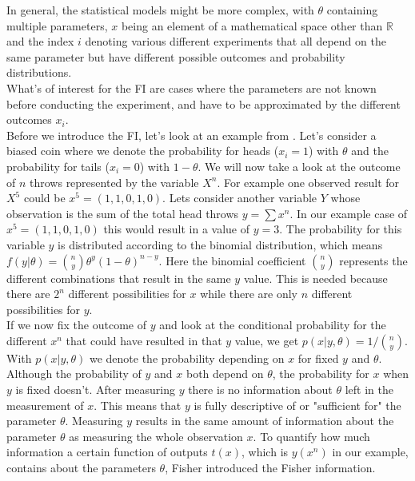 In general, the statistical models might be more complex, with $\theta$ containing multiple parameters, $x$ being an element of a mathematical space other than $\mathbb{R}$ and the index $i$ denoting various different experiments that all depend on the same parameter but have different possible outcomes and probability distributions.\\

What's of interest for the FI are cases where the parameters are not known before conducting the experiment, and have to be approximated by the different outcomes $x_i$.\\
Before we introduce the FI, let's look at an example from \cite{StatisticFisherInfoTutorial}. Let's consider a biased coin where we denote the probability for heads ($x_i = 1$) with $\theta$ and the probability for tails ($x_i = 0$) with $1-\theta$. We will now take a look at the outcome of $n$ throws represented by the variable $X^n$. For example one observed result for $X^5$ could be $x^5 = (1,1,0,1,0)$. Lets consider another variable $Y$ whose observation is the sum of the total head throws $y = \sum x^n$. In our example case of $x^5 = (1,1,0,1,0)$ this would result in a value of $y = 3$. The probability for this variable $y$ is distributed according to the binomial distribution, which means $f(y|\theta) = \binom{n}{y}\theta^y (1-\theta)^{n-y}$. Here the binomial coefficient $\binom{n}{y}$ represents the different combinations that result in the same $y$ value. This is needed because there are $2^n$ different possibilities for $x$ while there are only $n$ different possibilities for $y$.\\
If we now fix the outcome of $y$ and look at the conditional probability for the different $x^n$ that could have resulted in that $y$ value, we get $p(x|y,\theta) = 1/ \binom{n}{y}$. With $p(x|y,\theta)$ we denote the probability depending on $x$ for fixed $y$ and $\theta$. Although the probability of $y$ and $x$ both depend on $\theta$, the probability for $x$ when $y$ is fixed doesn't. After measuring $y$ there is no information about $\theta$ left in the measurement of $x$. This means that $y$ is fully descriptive of or "sufficient for" the parameter $\theta$. Measuring $y$ results in the same amount of information about the parameter $\theta$ as measuring the whole observation $x$. To quantify how much information a certain function of outputs $t(x)$, which is $y(x^n)$ in our example, contains about the parameters $\theta$, Fisher introduced the Fisher information.\\
